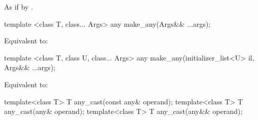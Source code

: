 \begin{itemdescr}
\pnum
\effects
As if by .
\end{itemdescr}

%
\begin{itemdecl}
template <class T, class... Args>
  any make_any(Args&& ...args);
\end{itemdecl}

\begin{itemdescr}
\pnum
\effects
Equivalent to: 
\end{itemdescr}

%
\begin{itemdecl}
template <class T, class U, class... Args>
  any make_any(initializer_list<U> il, Args&& ...args);
\end{itemdecl}

\begin{itemdescr}
\pnum
\effects
Equivalent to: 
\end{itemdescr}

%
\begin{itemdecl}
template<class T>
  T any_cast(const any& operand);
template<class T>
  T any_cast(any& operand);
template<class T>
  T any_cast(any&& operand);
\end{itemdecl}

